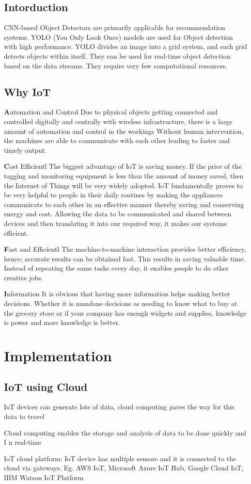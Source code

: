 \documentclass[12pt,a4paper]{report}
\begin{document}
\subsection{ Intorduction}
CNN-based Object Detectors are primarily applicable for recommendation systems. YOLO (You Only Look Once) models are used for Object detection with high performance. YOLO divides an image into a grid system, and each grid detects objects within itself. They can be used for real-time object detection based on the data streams. They require very few computational resources.

\subsection{Why IoT }
{\textbf Automation and Control}
Due to physical objects getting connected and controlled digitally and centrally with wireless infrastructure, there is a large amount of automation and control in the workings Without human intervention, the machines are able to communicate with each other leading to faster and timely output.\par
{\textbf Cost Efficientl}
The biggest advantage of IoT is saving money. If the price of the tagging and monitoring equipment is less than the amount of money saved, then the Internet of Things will be very widely adopted. IoT fundamentally proves to be very helpful to people in their daily routines by making the appliances communicate to each other in an effective manner thereby saving and conserving energy and cost. Allowing the data to be communicated and shared between devices and then translating it into our required way, it makes our systems efficient.\par
{\textbf Fast and Efficientl}
The machine-to-machine interaction provides better efficiency, hence; accurate results can be obtained fast. This results in saving valuable time. Instead of repeating the same tasks every day, it enables people to do other creative jobs.\par
{\textbf Information}
It is obvious that having more information helps making better decisions. Whether it is mundane decisions as needing to know what to buy at the grocery store or if your company has enough widgets and supplies, knowledge is power and more knowledge is better.
\newpage   
\section {\textbf{\large Implementation}}
\subsection{ IoT using Cloud}
IoT devices can generate lots of data, cloud computing paves the way for this data to travel\par
Cloud computing enables the storage and analysis of data to be done quickly and I n real-time\par
IoT cloud platform: IoT device has multiple sensors and it is connected to the cloud via gateways. Eg. AWS IoT, Microsoft Azure IoT Hub, Google Cloud IoT, IBM Watson IoT Platform\par
\newpage     
\end{document}

